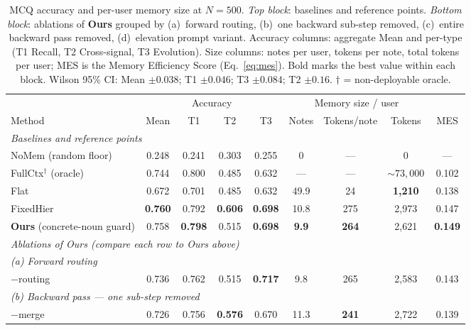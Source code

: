 \documentclass[sigconf,review,anonymous]{acmart}
\begin{document}
\begin{table}[!t]
\centering
\caption{MCQ accuracy and per-user memory size at \(N{=}500\). \emph{Top block}: baselines and reference points. \emph{Bottom block}: ablations of \textbf{Ours} grouped by (a)~forward routing, (b)~one backward sub-step removed, (c)~entire backward pass removed, (d)~elevation prompt variant. Accuracy columns: aggregate Mean and per-type (T1 Recall, T2 Cross-signal, T3 Evolution). Size columns: notes per user, tokens per note, total tokens per user; MES is the Memory Efficiency Score (Eq.~\ref{eq:mes}). Bold marks the best value within each block. Wilson 95\% CI: Mean $\pm 0.038$; T1 $\pm 0.046$; T3 $\pm 0.084$; T2 $\pm 0.16$. $\dagger$ = non-deployable oracle.}
\label{tab:results}
\footnotesize
\renewcommand{\arraystretch}{1.18}
\setlength{\tabcolsep}{4pt}
\begin{tabular}{lcccccccc}
\toprule
 & \multicolumn{4}{c}{Accuracy} & \multicolumn{3}{c}{Memory size / user} & \\
\cmidrule(lr){2-5} \cmidrule(lr){6-8}
Method & Mean & T1 & T2 & T3 & Notes & Tokens/note & Tokens & MES \\
\midrule
\multicolumn{9}{l}{\emph{Baselines and reference points}} \\
\quad NoMem (random floor)        & 0.248 & 0.241 & 0.303 & 0.255 & 0    & ---    & 0       & ---   \\
\quad FullCtx$^{\dagger}$ (oracle)& 0.744 & 0.800 & 0.485 & 0.632 & ---  & ---    & \(\sim\!73{,}000\) & 0.102 \\
\quad Flat~\cite{mem0}            & 0.672 & 0.701 & 0.485 & 0.632 & 49.9 & 24     & \textbf{1{,}210} & 0.138 \\
\quad FixedHier~\cite{personamem-v2} & \textbf{0.760} & 0.792 & \textbf{0.606} & \textbf{0.698} & 10.8 & 275 & 2{,}973 & 0.147 \\
\quad \textbf{Ours} (concrete-noun guard) & 0.758 & \textbf{0.798} & 0.515 & \textbf{0.698} & \textbf{9.9} & \textbf{264} & 2{,}621 & \textbf{0.149} \\
\midrule
\multicolumn{9}{l}{\emph{Ablations of Ours (compare each row to Ours above)}} \\
\multicolumn{9}{l}{\quad\emph{(a) Forward routing}} \\
\quad\quad $-$routing                       & 0.736 & 0.762 & 0.515 & \textbf{0.717} & 9.8 & 265 & 2{,}583 & 0.143 \\
\multicolumn{9}{l}{\quad\emph{(b) Backward pass --- one sub-step removed}} \\
\quad\quad $-$merge                         & 0.726 & 0.756 & \textbf{0.576} & 0.670 & 11.3 & \textbf{241} & 2{,}722 & 0.139 \\

\end{tabular}
\end{table}
\end{document}
